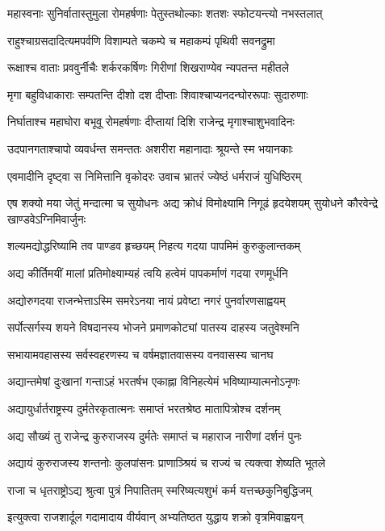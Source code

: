 \twolineshloka
{महास्वनाः सुनिर्वातास्तुमुला रोमहर्षणाः}
{पेतुस्तथोल्काः शतशः स्फोटयन्त्यो नभस्तलात्}


\twolineshloka
{राहुश्चाग्रसदादित्यमपर्वणि विशाम्पते}
{चकम्पे च महाकम्पं पृथिवी सवनद्रुमा}


\twolineshloka
{रूक्षाश्च वाताः प्रववुर्नीचैः शर्करकर्षिणः}
{गिरीणां शिखराण्येव न्यपतन्त महीतले}


\twolineshloka
{मृगा बहुविधाकाराः सम्पतन्ति दीशो दश}
{दीप्ताः शिवाश्चाप्यनदन्घोररूपाः सुदारुणाः}


\twolineshloka
{निर्घाताश्च महाघोरा बभूवू रोमहर्षणाः}
{दीप्तायां दिशि राजेन्द्र मृगाश्चाशुभवादिनः}


\twolineshloka
{उदपानगताश्चापो व्यवर्धन्त समन्ततः}
{अशरीरा महानादाः श्रूयन्ते स्म भयानकाः}


\twolineshloka
{एवमादीनि दृष्ट्वा स निमित्तानि वृकोदरः}
{उवाच भ्रातरं ज्येष्ठं धर्मराजं युधिष्ठिरम्}


एष शक्यो मया जेतुं मन्दात्मा च सुयोधनः
\twolineshloka
{अद्य क्रोधं विमोक्ष्यामि निगूढं हृदयेशयम्}
{सुयोधने कौरवेन्द्रे खाण्डवेऽग्निमिवार्जुनः}


\twolineshloka
{शल्यमद्योद्धरिष्यामि तव पाण्डव हृच्छयम्}
{निहत्य गदया पापमिमं कुरुकुलान्तकम्}


\twolineshloka
{अद्य कीर्तिमयीं मालां प्रतिमोक्ष्याम्यहं त्वयि}
{हत्वेमं पापकर्माणं गदया रणमूर्धनि}


\twolineshloka
{अद्योरुगदया राजन्भेत्ताऽस्मि समरेऽनया}
{नायं प्रवेष्टा नगरं पुनर्वारणसाह्वयम्}


\twolineshloka
{सर्पोत्सर्गस्य शयने विषदानस्य भोजने}
{प्रमाणकोट्यां पातस्य दाहस्य जतुवेश्मनि}


\twolineshloka
{सभायामवहासस्य सर्वस्वहरणस्य च}
{वर्षमज्ञातवासस्य वनवासस्य चानघ}


\twolineshloka
{अद्यान्तमेषां दुःखानां गन्ताऽहं भरतर्षभ}
{एकाह्ना विनिहत्येमं भविष्याम्यात्मनोऽनृणः}


\twolineshloka
{अद्यायुर्धार्तराष्ट्रस्य दुर्मतेरकृतात्मनः}
{समाप्तं भरतश्रेष्ठ मातापित्रोश्च दर्शनम्}


\twolineshloka
{अद्य सौख्यं तु राजेन्द्र कुरुराजस्य दुर्मतेः}
{समाप्तं च महाराज नारीणां दर्शनं पुनः}


\twolineshloka
{अद्यायं कुरुराजस्य शन्तनोः कुलपांसनः}
{प्राणाञ्श्रियं च राज्यं च त्यक्त्वा शेष्यति भूतले}


\twolineshloka
{राजा च धृतराष्ट्रोऽद्य श्रुत्वा पुत्रं निपातितम्}
{स्मरिष्यत्यशुभं कर्म यत्तच्छकुनिबुद्धिजम्}


\twolineshloka
{इत्युक्त्वा राजशार्दूल गदामादाय वीर्यवान्}
{अभ्यतिष्ठत युद्धाय शक्रो वृत्रमिवाह्वयन्}


